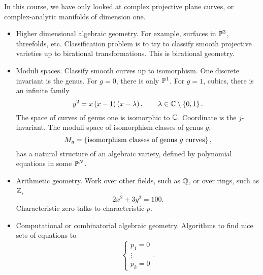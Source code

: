 In this course, we have only looked at complex projective plane curves, or complex-analytic manifolds of dimension one.
\begin{itemize}
\item Higher dimensional algebraic geometry. For example, surfaces in $ \P^3 $, threefolds, etc. Classification problem is to try to classify smooth projective varieties up to birational transformations. This is birational geometry.
\item Moduli spaces. Classify smooth curves up to isomorphism. One discrete invariant is the genus. For $ g = 0 $, there is only $ \P^1 $. For $ g = 1 $, cubics, there is an infinite family
$$ y^2 = x\rb{x - 1}\rb{x - \lambda}, \qquad \lambda \in \C \setminus \cb{0, 1}. $$
The space of curves of genus one is isomorphic to $ \C $. Coordinate is the $ j $-invariant. The moduli space of isomorphism classes of genus $ g $,
$$ M_g = \cb{\text{isomorphism classes of genus} \ g \ \text{curves}}, $$
has a natural structure of an algebraic variety, defined by polynomial equations in some $ \P^N $.
\item Arithmetic geometry. Work over other fields, such as $ \Q $, or over rings, such as $ \Z $,
$$ 2x^2 + 3y^2 = 100. $$
Characteristic zero talks to characteristic $ p $.
\item Computational or combinatorial algebraic geometry. Algorithms to find nice sets of equations to
$$
\begin{cases}
p_1 = 0 \\
\vdots \\
p_k = 0
\end{cases}.
$$
\end{itemize}


